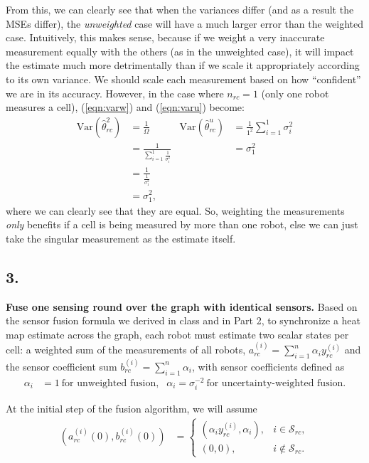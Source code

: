 \documentclass[12pt]{article}
\begin{document}
\begin{enumerate}[label=(\alph*)]
    From this, we can clearly see that when the variances differ (and as a result the MSEs differ), the \textit{unweighted} case will have a much larger error than the weighted case. Intuitively, this makes sense, because if we weight a very inaccurate measurement equally with the others (as in the unweighted case), it will impact the estimate much more detrimentally than if we scale it appropriately according to its own variance. We should scale each measurement based on how ``confident'' we are in its accuracy. However, in the case where $n_{rc}=1$ (only one robot measures a cell), (\ref{eqn:varw}) and (\ref{eqn:varu}) become:
    \begin{align*}
        \text{Var}(\hat\theta_{rc}^2)&=\frac{1}{\Omega} & \text{Var}(\hat\theta_{rc}^u)&=\frac{1}{1^2}\sum_{i=1}^1\sigma_i^2\\
        &=\frac{1}{\sum_{i=1}^1\frac{1}{\sigma_i^2}} & &=\sigma_1^2\\
        &=\frac{1}{\frac{1}{\sigma_1^2}} & &\\
        &=\sigma_1^2,
    \end{align*}
    where we can clearly see that they are equal. So, weighting the measurements \textit{only} benefits if a cell is being measured by more than one robot, else we can just take the singular measurement as the estimate itself.
\end{enumerate}

\clearpage
\subsection*{3.}
\textbf{Fuse one sensing round over the graph with identical sensors.}
Based on the sensor fusion formula we derived in class and in Part 2, to synchronize a heat map estimate across the graph, each robot must estimate two scalar states per cell: a weighted sum of the measurements of all robots, $a_{rc}^{(i)}=\sum_{i=1}^n\alpha_iy_{rc}^{(i)}$ and the sensor coefficient sum $b_{rc}^{(i)}=\sum_{i=1}^n\alpha_i$, with sensor coefficients defined as
\begin{align*}
    \alpha_i&=1\ \text{for unweighted fusion,} & \alpha_i=\sigma_i^{-2}\ \text{for uncertainty-weighted fusion.}
\end{align*}

At the initial step of the fusion algorithm, we will assume
\begin{align}\label{eqn:init}
    \left(a_{rc}^{(i)}(0),b_{rc}^{(i)}(0)\right)&=\begin{cases}
        (\alpha_iy_{rc}^{(i)},\alpha_i), & i\in\mathcal S_{rc},\\
        (0,0), & i\notin\mathcal S_{rc}.
    \end{cases}
\end{align}
\end{document}
